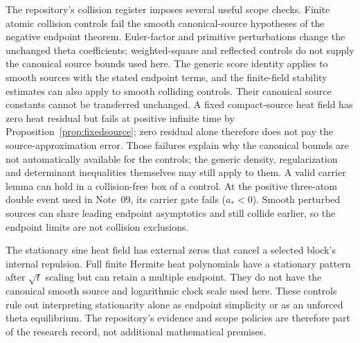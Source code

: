 The repository's collision register \cite{controls} imposes several
useful scope checks. Finite atomic collision controls fail the smooth
canonical-source hypotheses of the negative endpoint theorem.
Euler-factor and primitive perturbations change the unchanged theta
coefficients; weighted-square and reflected controls do not supply
the canonical source bounds used here.
The generic score identity applies to smooth sources with the stated
endpoint terms, and the finite-field stability estimates can also apply
to smooth colliding controls. Their canonical source constants cannot
be transferred unchanged. A fixed compact-source heat field has zero
heat residual but fails at positive infinite time by
Proposition~\ref{prop:fixedsource}; zero residual alone therefore does
not pay the source-approximation error.
Those failures explain why the canonical bounds are not automatically
available for the controls; the generic density, regularization and
determinant inequalities themselves may still apply to them.
A valid carrier lemma can hold in a collision-free box of a control.
At the positive three-atom double event used in Note~09, its carrier
gate fails ($a_*<0$).
Smooth perturbed sources can share leading endpoint asymptotics and
still collide earlier, so the endpoint limits are not collision
exclusions.

The stationary sine heat field has external zeros that cancel a
selected block's internal repulsion. Full finite Hermite heat
polynomials have a stationary pattern after $\sqrt t$ scaling but can
retain a multiple endpoint. They do not have the canonical smooth
source and logarithmic clock scale used here.
These controls rule out interpreting stationarity alone as endpoint
simplicity or as an unforced theta equilibrium.
The repository's evidence and scope policies \cite{scope} are therefore
part of the research record, not additional mathematical premises.

